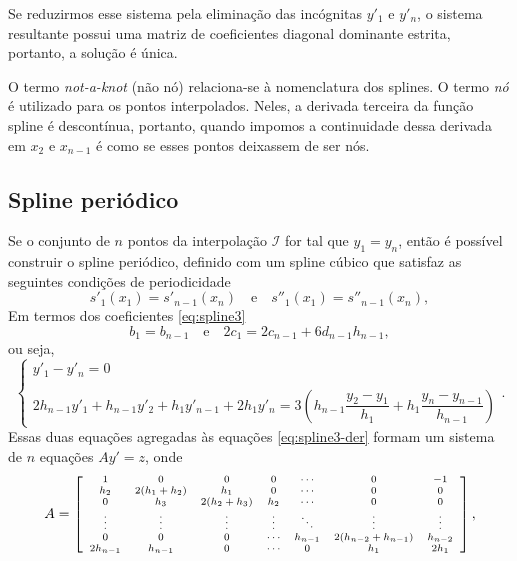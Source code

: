 Se reduzirmos esse sistema pela eliminação das incógnitas $y'_1$ e $y'_n$, o sistema resultante possui uma matriz de coeficientes diagonal dominante estrita, portanto, a solução é única.

O termo \textit{not-a-knot} (não nó) relaciona-se à nomenclatura dos splines. O termo \textit{nó} é utilizado para os pontos interpolados. Neles, a derivada terceira da função spline é descontínua, portanto, quando impomos a continuidade dessa derivada em $x_2$ e $x_{n-1}$ é como se esses pontos deixassem de ser nós.

\subsection{Spline periódico}
Se o conjunto de $n$ pontos da interpolação $\mathcal{I}$ for tal que $y_1=y_n$, então é possível construir o spline periódico, definido com um spline cúbico que satisfaz as seguintes condições de periodicidade
\begin{equation*}
	s'_1(x_1)=s'_{n-1}(x_n)\quad\text{e}\quad	s''_1(x_1)=s''_{n-1}(x_n),
\end{equation*}
Em termos dos coeficientes \eqref{eq:spline3}
\begin{equation*}
	b_1=b_{n-1}\quad\text{e}\quad 2c_1=2c_{n-1}+6d_{n-1}h_{n-1},
\end{equation*}
ou seja,
\begin{equation}
	\left\{\begin{array}{l}
			y'_1-y'_n=0\\
			\\
			2h_{n-1}y'_1+h_{n-1}y'_2+h_1y'_{n-1}+2h_1y'_n=3\left(h_{n-1}\dfrac{y_2-y_1}{h_1}+h_1\dfrac{y_n-y_{n-1}}{h_{n-1}}\right)
		\end{array}
	\right. .
\end{equation}
Essas duas equações agregadas às equações \eqref{eq:spline3-der} formam um sistema de $n$ equações $Ay' = z$, onde
\begin{equation*}
	\begin{scriptsize}
		A=\left[\begin{array}{ccccccc}
			1&0&0&0&\cdots&0&-1\\
			h_2&2(h_1+h_2)&h_1&0&\cdots&0&0\\
			0&h_3&2(h_2+h_3)&h_2&\cdots&0&0\\
			\vdots&\vdots&\vdots&\vdots&\ddots&\vdots&\vdots\\
			0&0&0&\cdots&h_{n-1} & 2(h_{n-2}+h_{n-1})&h_{n-2}\\
			2h_{n-1}&h_{n-1}&0&\cdots &0&h_1&2h_1
			\end{array}\right], 
	\end{scriptsize} 
\end{equation*}
